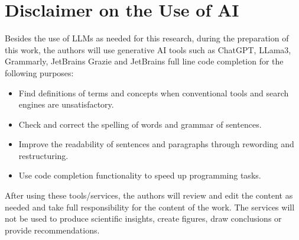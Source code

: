\section{Disclaimer on the Use of AI}
\label{sec:disclaimer-use-ai}

Besides the use of LLMs as needed for this research, during the preparation of this work, the authors will use
generative AI tools such as ChatGPT, LLama3, Grammarly, JetBrains Grazie and JetBrains full line code completion for the
following purposes:

\begin{itemize}
    \item Find definitions of terms and concepts when conventional tools and search engines are unsatisfactory.
    \item Check and correct the spelling of words and grammar of sentences.
    \item Improve the readability of sentences and paragraphs through rewording and restructuring.
    \item Use code completion functionality to speed up programming tasks.
\end{itemize}

After using these tools/services, the authors will review and edit the content as needed and take full
responsibility for the content of the work.
The services will not be used to produce scientific insights, create figures, draw conclusions or provide
recommendations.